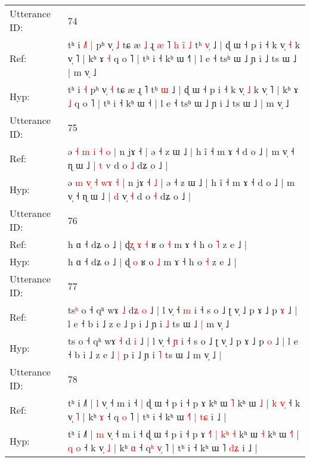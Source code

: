 \documentclass[10pt]{article}
\DeclareRobustCommand{\hl}[1]{{\textcolor{red}{#1}}}
\begin{document}
\begin{longtable}{ll}
 \\
\midrule
Utterance ID: & 74 \\
Ref: & tʰ i\hl{ }\hl{˩}\hl{˥} \hl{|} pʰ v̩ \hl{˩} tɕ æ\hl{ }\hl{˩} ɻ\hl{ }\hl{æ} ˥\hl{ }\hl{h}\hl{ }\hl{i}\hl{̃}\hl{ }\hl{˩} tʰ \hl{v}\hl{̩} ˩ | ɖ ɯ ˧ p i ˧ k v̩ \hl{˧} k v̩ ˥ | kʰ ɤ \hl{˧} q o ˥ | tʰ i ˧ kʰ ɯ ˧\hl{˥} | l e ˧ tsʰ ɯ ˩ ɲ i ˩ ts ɯ ˩ | m v̩ ˩
 \\
Hyp: & tʰ i\hl{}\hl{}\hl{} \hl{˧} pʰ v̩ \hl{˧} tɕ æ\hl{}\hl{} ɻ\hl{}\hl{} ˥\hl{}\hl{}\hl{}\hl{}\hl{}\hl{}\hl{} tʰ \hl{}\hl{ɯ} ˩ | ɖ ɯ ˧ p i ˧ k v̩ \hl{˩} k v̩ ˥ | kʰ ɤ \hl{˩} q o ˥ | tʰ i ˧ kʰ ɯ ˧\hl{} | l e ˧ tsʰ ɯ ˩ ɲ i ˩ ts ɯ ˩ | m v̩ ˩
 \\
\midrule
Utterance ID: & 75 \\
Ref: & ə \hl{˧} \hl{}\hl{m} \hl{i} \hl{}\hl{˧} \hl{o} | n jɤ ˧\hl{}\hl{} | ə ˧ z ɯ ˩ | h ĩ ˧ m ɤ ˧ d o ˩ | m v̩ ˧ ɳ ɯ ˩ | \hl{t} v\hl{}\hl{}\hl{} d o \hl{˩} dʑ o ˩ |
 \\
Hyp: & ə \hl{m} \hl{v}\hl{̩} \hl{˧} \hl{w}\hl{ɤ} \hl{˧} | n jɤ ˧\hl{ }\hl{˩} | ə ˧ z ɯ ˩ | h ĩ ˧ m ɤ ˧ d o ˩ | m v̩ ˧ ɳ ɯ ˩ | \hl{d} v\hl{̩}\hl{ }\hl{˧} d o \hl{˧} dʑ o ˩ |
 \\
\midrule
Utterance ID: & 76 \\
Ref: & h ɑ ˧ dʑ o ˩ | ɖ\hl{ʐ}\hl{ }\hl{ɤ} \hl{˧} ʁ o \hl{˧} m ɤ ˧ h o \hl{˥} z e ˩ |
 \\
Hyp: & h ɑ ˧ dʑ o ˩ | ɖ\hl{}\hl{}\hl{} \hl{o} ʁ o \hl{˩} m ɤ ˧ h o \hl{˧} z e ˩ |
 \\
\midrule
Utterance ID: & 77 \\
Ref: & ts\hl{ʰ} o ˧ qʰ wɤ \hl{˩} d\hl{ʑ} \hl{o} ˩ | l v̩ ˧ \hl{m} i ˧ s o ˩ ʈ v̩ ˩ p ɤ ˩ p \hl{ɤ} ˩ | l e ˧ b i ˩ z e ˩\hl{}\hl{} p i ˩ ɲ i \hl{˩} ts ɯ ˩\hl{ }\hl{|} m v̩ ˩\hl{}\hl{}
 \\
Hyp: & ts\hl{} o ˧ qʰ wɤ \hl{˧} d\hl{} \hl{i} ˩ | l v̩ ˧ \hl{ɲ} i ˧ s o ˩ ʈ v̩ ˩ p ɤ ˩ p \hl{o} ˩ | l e ˧ b i ˩ z e ˩\hl{ }\hl{|} p i ˩ ɲ i \hl{˥} ts ɯ ˩\hl{}\hl{} m v̩ ˩\hl{ }\hl{|}
 \\
\midrule
Utterance ID: & 78 \\
Ref: & tʰ i ˩˥ | \hl{l} v̩ ˧ m i ˧\hl{ }\hl{|} ɖ ɯ ˧ p i ˧ p ɤ\hl{}\hl{}\hl{}\hl{}\hl{}\hl{}\hl{}\hl{}\hl{}\hl{} kʰ ɯ \hl{˥} kʰ ɯ \hl{}\hl{˩} | \hl{k} \hl{v}\hl{̩} ˧ k v̩ \hl{˥} | kʰ \hl{ɤ} ˧ q\hl{} \hl{}\hl{o} ˥ | tʰ i ˧ kʰ ɯ \hl{˧}˥\hl{ }\hl{|} \hl{t}\hl{ɕ} i ˩ |
 \\
Hyp: & tʰ i ˩˥ | \hl{m} v̩ ˧ m i ˧\hl{}\hl{} ɖ ɯ ˧ p i ˧ p ɤ\hl{ }\hl{˧}\hl{˥}\hl{ }\hl{|}\hl{ }\hl{k}\hl{ʰ}\hl{ }\hl{˧} kʰ ɯ \hl{˧} kʰ ɯ \hl{˧}\hl{˥} | \hl{q} \hl{}\hl{o} ˧ k v̩ \hl{˩} | kʰ \hl{ɑ} ˧ q\hl{ʰ} \hl{v}\hl{̩} ˥ | tʰ i ˧ kʰ ɯ \hl{}˥\hl{}\hl{} \hl{d}\hl{ʑ} i ˩ |

\end{longtable}
\end{document}
